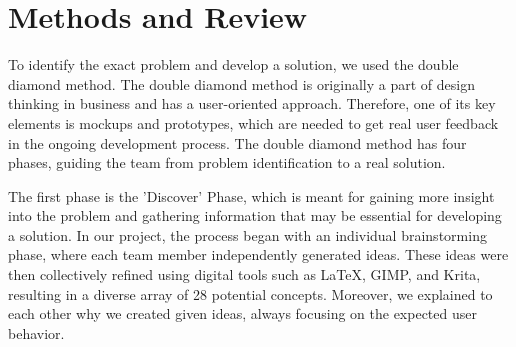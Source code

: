 \documentclass{article}
\begin{document}





\section{Methods and Review}
To identify the exact problem and develop a solution, we used the double diamond method.
The double diamond method is originally a part of design thinking in business and has a user-oriented approach.
Therefore, one of its key elements is mockups and prototypes,
which are needed to get real user feedback in the ongoing development process.
The double diamond method has four phases, guiding the team from problem identification to a real solution.

The first phase is the 'Discover' Phase,
which is meant for gaining more insight into the problem and gathering information that may be essential for developing a solution.
In our project, the process began with an individual brainstorming phase, where each team member independently generated ideas.
These ideas were then collectively refined using digital tools such as
LaTeX, GIMP, and Krita, resulting in a diverse array of 28 potential concepts.
Moreover, we explained to each other why we created given ideas, always focusing on the expected user behavior.
\end{document}
